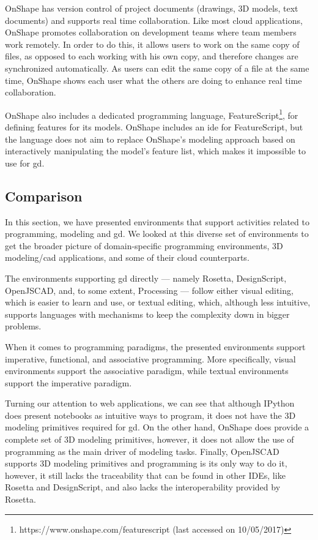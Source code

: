 OnShape has version control of project documents (drawings, 3D models, text documents) and supports real time collaboration.
Like most cloud applications, OnShape promotes collaboration on development teams where team members work remotely.
In order to do this, it allows users to work on the same copy of files, as opposed to each working with his own copy, and therefore changes are synchronized automatically.
As users can edit the same copy of a file at the same time, OnShape shows each user what the others are doing to enhance real time collaboration.

OnShape also includes a dedicated programming language, FeatureScript\footnote{https://www.onshape.com/featurescript (last accessed on 10/05/2017)}, for defining features for its models.
OnShape includes an \gls{ide} for FeatureScript, but the language does not aim to replace OnShape's modeling approach based on interactively manipulating the model's feature list, which makes it impossible to use for \gls{gd}.


\subsection{Comparison}
In this section, we have presented environments that support activities related to programming, modeling and \gls{gd}.
We looked at this diverse set of environments to get the broader picture of domain-specific programming environments, 3D modeling/\gls{cad} applications, and some of their cloud counterparts.

The environments supporting \gls{gd} directly --- namely Rosetta, DesignScript, OpenJSCAD, and, to some extent, Processing --- follow either visual editing, which is easier to learn and use, or textual editing, which, although less intuitive, supports languages with mechanisms to keep the complexity down in bigger problems.

When it comes to programming paradigms, the presented environments support imperative, functional, and associative programming.
More specifically, visual environments support the associative paradigm, while textual environments support the imperative paradigm.

Turning our attention to web applications, we can see that although IPython does present notebooks as intuitive ways to program, it does not have the 3D modeling primitives required for \gls{gd}.
On the other hand, OnShape does provide a complete set of 3D modeling primitives, however, it does not allow the use of programming as the main driver of modeling tasks.
Finally, OpenJSCAD supports 3D modeling primitives and programming is its only way to do it, however, it still lacks the traceability that can be found in other IDEs, like Rosetta and DesignScript, and also lacks the interoperability provided by Rosetta.


